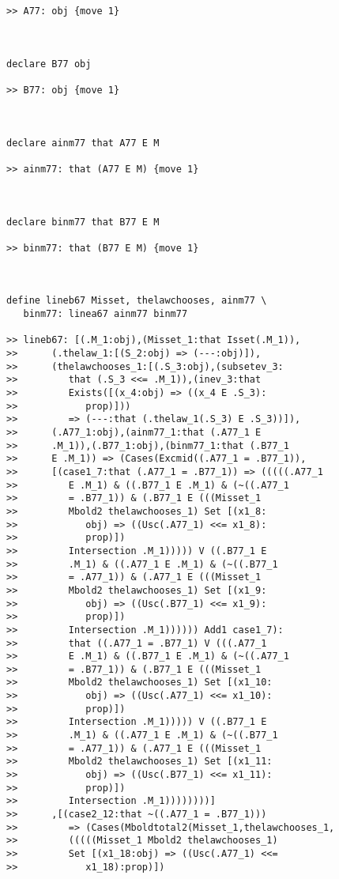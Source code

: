 \documentclass[12pt]{article}
\begin{document}
\begin{verbatim}
>> A77: obj {move 1}



declare B77 obj

>> B77: obj {move 1}



declare ainm77 that A77 E M

>> ainm77: that (A77 E M) {move 1}



declare binm77 that B77 E M

>> binm77: that (B77 E M) {move 1}



define lineb67 Misset, thelawchooses, ainm77 \
   binm77: linea67 ainm77 binm77

>> lineb67: [(.M_1:obj),(Misset_1:that Isset(.M_1)),
>>      (.thelaw_1:[(S_2:obj) => (---:obj)]),
>>      (thelawchooses_1:[(.S_3:obj),(subsetev_3:
>>         that (.S_3 <<= .M_1)),(inev_3:that
>>         Exists([(x_4:obj) => ((x_4 E .S_3):
>>            prop)]))
>>         => (---:that (.thelaw_1(.S_3) E .S_3))]),
>>      (.A77_1:obj),(ainm77_1:that (.A77_1 E
>>      .M_1)),(.B77_1:obj),(binm77_1:that (.B77_1
>>      E .M_1)) => (Cases(Excmid((.A77_1 = .B77_1)),
>>      [(case1_7:that (.A77_1 = .B77_1)) => (((((.A77_1
>>         E .M_1) & ((.B77_1 E .M_1) & (~((.A77_1
>>         = .B77_1)) & (.B77_1 E (((Misset_1
>>         Mbold2 thelawchooses_1) Set [(x1_8:
>>            obj) => ((Usc(.A77_1) <<= x1_8):
>>            prop)])
>>         Intersection .M_1))))) V ((.B77_1 E
>>         .M_1) & ((.A77_1 E .M_1) & (~((.B77_1
>>         = .A77_1)) & (.A77_1 E (((Misset_1
>>         Mbold2 thelawchooses_1) Set [(x1_9:
>>            obj) => ((Usc(.B77_1) <<= x1_9):
>>            prop)])
>>         Intersection .M_1)))))) Add1 case1_7):
>>         that ((.A77_1 = .B77_1) V (((.A77_1
>>         E .M_1) & ((.B77_1 E .M_1) & (~((.A77_1
>>         = .B77_1)) & (.B77_1 E (((Misset_1
>>         Mbold2 thelawchooses_1) Set [(x1_10:
>>            obj) => ((Usc(.A77_1) <<= x1_10):
>>            prop)])
>>         Intersection .M_1))))) V ((.B77_1 E
>>         .M_1) & ((.A77_1 E .M_1) & (~((.B77_1
>>         = .A77_1)) & (.A77_1 E (((Misset_1
>>         Mbold2 thelawchooses_1) Set [(x1_11:
>>            obj) => ((Usc(.B77_1) <<= x1_11):
>>            prop)])
>>         Intersection .M_1))))))))]
>>      ,[(case2_12:that ~((.A77_1 = .B77_1)))
>>         => (Cases(Mboldtotal2(Misset_1,thelawchooses_1,
>>         (((((Misset_1 Mbold2 thelawchooses_1)
>>         Set [(x1_18:obj) => ((Usc(.A77_1) <<=
>>            x1_18):prop)])

\end{verbatim}
\end{document}
